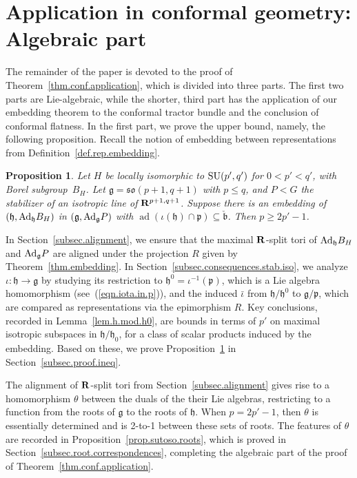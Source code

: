 \documentclass[10pt,a4paper]{amsart}
\numberwithin{equation}{section}
\newtheorem{prop}[thm]{Proposition}
\theoremstyle{definition}
\newcommand{\BR}{{\bf R}}
\newcommand{\lieg}{\mathfrak{g}}
\newcommand{\lieh}{\mathfrak{h}}
\def\g{{\mathfrak g}}
\def\h{{\mathfrak h}}
\def\p{{\mathfrak p}}
\def\b{{\mathfrak b}}
\newcommand{\so}{\mathfrak{so}}
\newcommand{\SU}{{\rm SU}}
\begin{document}
\section{Application in conformal geometry: Algebraic part}

The remainder of the paper is devoted to the proof of Theorem~\ref{thm.conf.application}, which is divided into three parts. The first two parts are Lie-algebraic, while the shorter, third part has the application of our embedding theorem to the conformal tractor bundle and the conclusion of conformal flatness. In the first part, we prove the upper bound, namely, the following proposition. Recall the notion of embedding between representations from Definition~\ref{def.rep.embedding}.

\begin{prop}
\label{prop.sutoso.ineq}
Let $H$ be locally isomorphic to $\SU(p',q')$ for $0 < p' < q'$, with Borel subgroup~$B_H$. Let $\lieg = \so(p+1,q+1)$ with $p \leq q$, and $P < G$ the stabilizer of an isotropic line of $\BR^{p+1,q+1}$. Suppose there is an embedding of~$(\lieh, {\rm Ad}_\h B_H)$ in $(\lieg, {\rm Ad}_\g P)$ with $\operatorname{ad}(\iota(\lieh) \cap \p ) \subseteq \check{\b}$. Then $p \geq 2 p'-1$.
\end{prop}

In Section~\ref{subsec.alignment}, we ensure that the maximal $\BR$-split tori of ${\rm Ad}_{\h} B_H$ and ${\rm Ad}_\g P$ are aligned under the projection $R$ given by Theorem~\ref{thm.embedding}. In Section~\ref{subsec.consequences.stab.iso}, we analyze $\iota\colon \h \rightarrow \g$ by studying its restriction to $\h^0 = \iota^{-1}(\p)$, which is a Lie algebra homomorphism (see~(\ref{eqn.iota.in.p})), and the induced $\bar{\iota}$ from $\h/\h^0$ to $\g/\p$, which are compared as representations via the epimorphism $R$. Key conclusions, recorded in Lemma~\ref{lem.h.mod.h0}, are bounds in terms of $p'$ on maximal isotropic subspaces in $\h/\h_0$, for a class of scalar products induced by the embedding. Based on these, we prove Proposition~\ref{prop.sutoso.ineq} in Section~\ref{subsec.proof.ineq}.

The alignment of $\BR$-split tori from Section~\ref{subsec.alignment} gives rise to a homomorphism $\theta$ between the duals of the their Lie algebras, restricting to a function from the roots of $\g$ to the roots of $\h$. When $p=2p'-1$, then $\theta$ is essentially determined and is 2-to-1 between these sets of roots. The features of $\theta$ are recorded in Proposition~\ref{prop.sutoso.roots}, which is proved in Section~\ref{subsec.root.correspondences}, completing the algebraic part of the proof of Theorem~\ref{thm.conf.application}.
\end{document}
